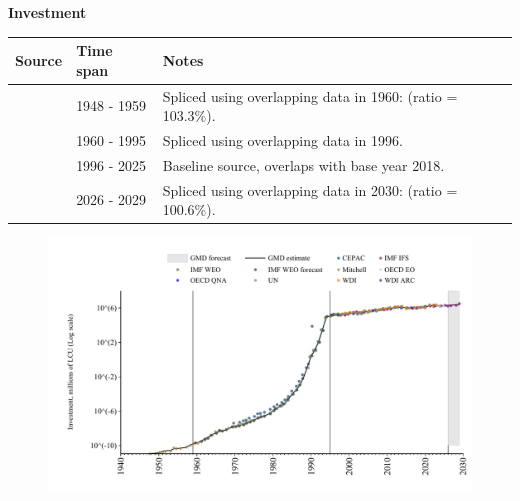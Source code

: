 \documentclass[12pt,a4paper,landscape]{article}
\begin{document}
\begin{adjustbox}{max totalsize={\paperwidth}{\paperheight},center}
\begin{minipage}[t][\textheight][t]{\textwidth}
\vspace*{0.5cm}
{}
\begin{center}
{\Large\bfseries Investment}
\end{center}
\vspace{0.5cm}
\begin{table}[H]
\centering
\small
\begin{tabular}{|l|l|l|}
\hline
\textbf{Source} & \textbf{Time span} & \textbf{Notes} \\
\hline
\rowcolor{white}\cite{Mitchell}& 1948 - 1959 &Spliced using overlapping data in 1960: (ratio = 103.3\%). \\
\rowcolor{lightgray}\cite{WDI}& 1960 - 1995 &Spliced using overlapping data in 1996. \\
\rowcolor{white}\cite{OECD_EO}& 1996 - 2025 &Baseline source, overlaps with base year 2018. \\
\rowcolor{lightgray}\cite{IMF_WEO_forecast}& 2026 - 2029 &Spliced using overlapping data in 2030: (ratio = 100.6\%). \\
\hline
\end{tabular}
\end{table}
\begin{figure}[H]
\centering
\includegraphics[width=\textwidth,height=0.6\textheight,keepaspectratio]{graphs/BRA_inv.pdf}
\end{figure}
\end{minipage}
\end{adjustbox}
\end{document}
